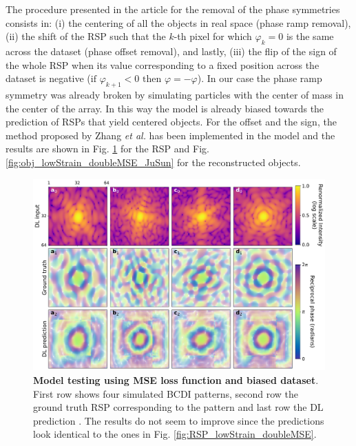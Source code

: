 The procedure presented in the article for the removal of the phase symmetries consists in: (i) the centering of all the 
objects in real space (phase ramp removal), (ii) the shift of the RSP such that the $k$-th pixel for which $\varphi_k = 0$
is the same across the dataset (phase offset removal), and lastly, (iii) the flip of the sign of the whole RSP when its 
value corresponding to a fixed position across the dataset is negative ($ \text{if  } \varphi_{k+1} <0 \text{  then  } 
\varphi = -\varphi $). In our case the phase ramp symmetry was already broken by simulating 
particles with the center of mass in the center of the array. In this way the model is already biased towards the prediction 
of RSPs that yield centered objects. For the offset and the sign, the method proposed by Zhang \textit{et al.} has been 
implemented in the model and the results are shown in Fig. \ref{fig:RSP_lowStrain_doubleMSE_JuSun} for the RSP and 
Fig. \ref{fig:obj_lowStrain_doubleMSE_JuSun} for the reconstructed objects. 

\begin{figure}[H]
    \centering
    \includegraphics[width=.8\textwidth]{figures/Phasing/RSP_low_strain_doubleMSE_symmJuSun.pdf}
    \caption{\textbf{Model testing using MSE loss function and biased dataset}. First row shows four simulated BCDI patterns, second row the ground truth RSP 
    corresponding to the pattern and last row the DL prediction . The results do not seem to improve since the predictions 
    look identical to the ones in Fig. \ref{fig:RSP_lowStrain_doubleMSE}.}
    \label{fig:RSP_lowStrain_doubleMSE_JuSun}
\end{figure}

